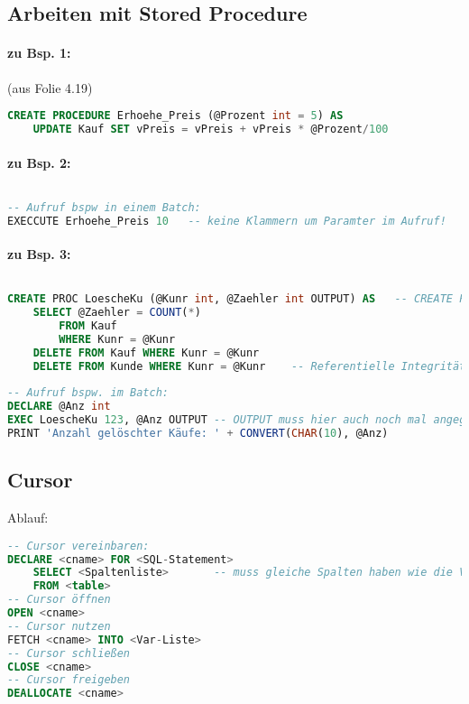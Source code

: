 \subsection{Arbeiten mit Stored Procedure}
\paragraph{zu Bsp. 1:} (aus Folie 4.19)
\begin{lstlisting}[language=SQL]
CREATE PROCEDURE Erhoehe_Preis (@Prozent int = 5) AS
	UPDATE Kauf SET vPreis = vPreis + vPreis * @Prozent/100
\end{lstlisting}
\paragraph{zu Bsp. 2:} $ $
\begin{lstlisting}[language=SQL]
-- Aufruf bspw in einem Batch:
EXECCUTE Erhoehe_Preis 10	-- keine Klammern um Paramter im Aufruf!
\end{lstlisting}
\paragraph{zu Bsp. 3:} $ $
\begin{lstlisting}[language=SQL]
CREATE PROC LoescheKu (@Kunr int, @Zaehler int OUTPUT) AS	-- CREATE PROC: Abkürzung für CREATE PROCEDURE
	SELECT @Zaehler = COUNT(*)
		FROM Kauf
		WHERE Kunr = @Kunr
	DELETE FROM Kauf WHERE Kunr = @Kunr
	DELETE FROM Kunde WHERE Kunr = @Kunr	-- Referentielle Integrität: Erst Kauf, dann Kunde löschen!
	
-- Aufruf bspw. im Batch:
DECLARE @Anz int
EXEC LoescheKu 123, @Anz OUTPUT -- OUTPUT muss hier auch noch mal angegeben werden!
PRINT 'Anzahl gelöschter Käufe: ' + CONVERT(CHAR(10), @Anz)
\end{lstlisting}

\subsection{Cursor}
Ablauf:
\begin{lstlisting}[language=SQL]
-- Cursor vereinbaren:
DECLARE <cname> FOR <SQL-Statement>
	SELECT <Spaltenliste>		-- muss gleiche Spalten haben wie die Var-Liste im fetch
	FROM <table>
-- Cursor öffnen
OPEN <cname>
-- Cursor nutzen
FETCH <cname> INTO <Var-Liste>
-- Cursor schließen
CLOSE <cname>
-- Cursor freigeben
DEALLOCATE <cname>
\end{lstlisting}

